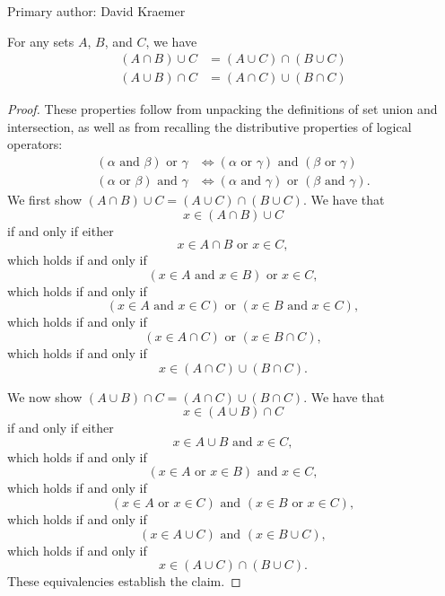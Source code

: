 Primary author: David Kraemer

\begin{majorEx}%
    For any sets $A$, $B$, and $C$, we have
    \begin{align*}
        (A \cap B) \cup C &= (A \cup C) \cap (B \cup C) \\
        (A \cup B) \cap C &= (A \cap C) \cup (B \cap C)
    \end{align*}
\end{majorEx}
\begin{proof}
    These properties follow from unpacking the definitions of set union and
    intersection, as well as from recalling the distributive properties of
    logical operators:
    \begin{align*}
        (\alpha \text{ and } \beta) \text{ or } \gamma &\iff (\alpha \text{ or }
        \gamma) \text{ and } (\beta \text{ or } \gamma) \\
        (\alpha \text{ or } \beta) \text{ and } \gamma &\iff (\alpha \text{ and
        } \gamma) \text{ or } (\beta \text{ and } \gamma).
    \end{align*}
    We first show  $(A \cap B) \cup C = (A \cup C) \cap (B \cup C)$. We have
    that
    \[
        x \in (A \cap B) \cup C
    \]
    if and only if either 
    \[
        x \in A \cap B \text{ or } x \in C,
    \] 
    which holds if and only if
    \[
        (x \in A \text{ and } x \in B) \text{ or } x \in C,
    \]
    which holds if and only if 
    \[
        (x \in A \text{ and } x \in C) \text{ or } (x \in B \text{ and } x \in C), 
    \]
    which holds if and only if
    \[
        (x \in A \cap C) \text{ or } (x \in B \cap C),
    \]
    which holds if and only if
    \[
        x \in (A \cap C) \cup (B \cap C).
    \]

    We now show  $(A \cup B) \cap C = (A \cap C) \cup (B \cap C)$. We have that
    \[
        x \in (A \cup B) \cap C
    \]
    if and only if either 
    \[
        x \in A \cup B \text{ and } x \in C,
    \] 
    which holds if and only if
    \[
        (x \in A \text{ or } x \in B) \text{ and } x \in C,
    \]
    which holds if and only if 
    \[
        (x \in A \text{ or } x \in C) \text{ and } (x \in B \text{ or } x \in C), 
    \]
    which holds if and only if
    \[
        (x \in A \cup C) \text{ and } (x \in B \cup C),
    \]
    which holds if and only if
    \[
        x \in (A \cup C) \cap (B \cup C).
    \]
    These equivalencies establish the claim.
\end{proof}

